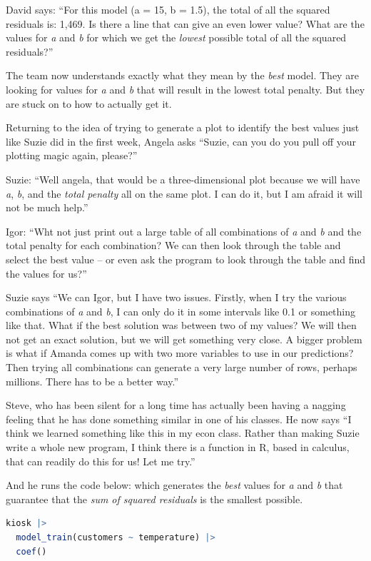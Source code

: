 \documentclass[
  12pt,
  letterpaper,
  DIV=11,
  numbers=noendperiod]{scrreprt}
\begin{document}
David says: ``For this model (a = 15, b = 1.5), the total of all the
squared residuals is: 1,469. Is there a line that can give an even lower
value? What are the values for \emph{a} and \emph{b} for which we get
the \emph{lowest} possible total of all the squared residuals?''

The team now understands exactly what they mean by the \emph{best}
model. They are looking for values for \emph{a} and \emph{b} that will
result in the lowest total penalty. But they are stuck on to how to
actually get it.

Returning to the idea of trying to generate a plot to identify the best
values just like Suzie did in the first week, Angela asks ``Suzie, can
you do you pull off your plotting magic again, please?''

Suzie: ``Well angela, that would be a three-dimensional plot because we
will have \emph{a}, \emph{b}, and the \emph{total penalty} all on the
same plot. I can do it, but I am afraid it will not be much help.''

Igor: ``Wht not just print out a large table of all combinations of
\emph{a} and \emph{b} and the total penalty for each combination? We can
then look through the table and select the best value -- or even ask the
program to look through the table and find the values for us?''

Suzie says ``We can Igor, but I have two issues. Firstly, when I try the
various combinations of \emph{a} and \emph{b}, I can only do it in some
intervals like 0.1 or something like that. What if the best solution was
between two of my values? We will then not get an exact solution, but we
will get something very close. A bigger problem is what if Amanda comes
up with two more variables to use in our predictions? Then trying all
combinations can generate a very large number of rows, perhaps millions.
There has to be a better way.''

Steve, who has been silent for a long time has actually been having a
nagging feeling that he has done something similar in one of his
classes. He now says ``I think we learned something like this in my econ
class. Rather than making Suzie write a whole new program, I think there
is a function in R, based in calculus, that can readily do this for us!
Let me try.''

And he runs the code below: which generates the \emph{best} values for
\emph{a} and \emph{b} that guarantee that the \emph{sum of squared
residuals} is the smallest possible.

\begin{lstlisting}[language=R]
kiosk |> 
  model_train(customers ~ temperature) |> 
  coef()
\end{lstlisting}
\end{document}
